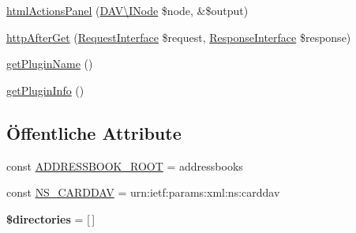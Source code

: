 \begin{DoxyCompactItemize}
\item 
\mbox{\hyperlink{class_sabre_1_1_card_d_a_v_1_1_plugin_a7cf2bf1fc6f4069876ac83e597d98df9}{html\+Actions\+Panel}} (\mbox{\hyperlink{interface_sabre_1_1_d_a_v_1_1_i_node}{D\+A\+V\textbackslash{}\+I\+Node}} \$node, \&\$output)
\item 
\mbox{\hyperlink{class_sabre_1_1_card_d_a_v_1_1_plugin_ad141184f83d9e6f6a287f2b4909edf51}{http\+After\+Get}} (\mbox{\hyperlink{interface_sabre_1_1_h_t_t_p_1_1_request_interface}{Request\+Interface}} \$request, \mbox{\hyperlink{interface_sabre_1_1_h_t_t_p_1_1_response_interface}{Response\+Interface}} \$response)
\item 
\mbox{\hyperlink{class_sabre_1_1_card_d_a_v_1_1_plugin_a94a56e6c2a32374fee033475954b1402}{get\+Plugin\+Name}} ()
\item 
\mbox{\hyperlink{class_sabre_1_1_card_d_a_v_1_1_plugin_abebe74e2defb27bc62f859094fb7f93a}{get\+Plugin\+Info}} ()
\end{DoxyCompactItemize}
\subsection*{Öffentliche Attribute}
\begin{DoxyCompactItemize}
\item 
const \mbox{\hyperlink{class_sabre_1_1_card_d_a_v_1_1_plugin_a27431ea63a5f3a2cbf904abcacaaf196}{A\+D\+D\+R\+E\+S\+S\+B\+O\+O\+K\+\_\+\+R\+O\+OT}} = \textquotesingle{}addressbooks\textquotesingle{}
\item 
const \mbox{\hyperlink{class_sabre_1_1_card_d_a_v_1_1_plugin_ab2f9b3534cc38e89d3905dd6ea1ee042}{N\+S\+\_\+\+C\+A\+R\+D\+D\+AV}} = \textquotesingle{}urn\+:ietf\+:params\+:xml\+:ns\+:carddav\textquotesingle{}
\item 
\mbox{\label{class_sabre_1_1_card_d_a_v_1_1_plugin_a74358234a5196acc92dd4552eab16a76}} 
{\bfseries \$directories} = \mbox{[}$\,$\mbox{]}
\end{DoxyCompactItemize}
